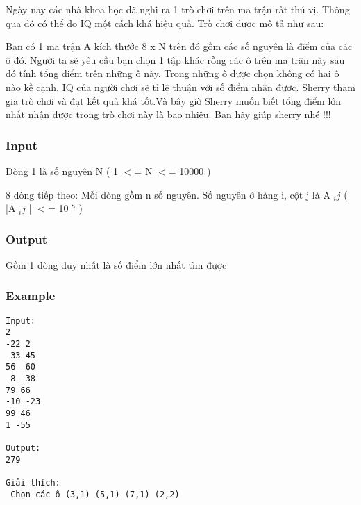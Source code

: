 



   Ngày nay các nhà khoa học đã nghĩ ra 1 trò chơi trên ma trận rất thú vị. Thông qua đó có thể đo IQ một cách khá hiệu quả. Trò chơi được mô tả như sau:  

   Bạn có 1 ma trận A kích thước 8 x N trên đó gồm các số nguyên là điểm của các ô đó. Người ta sẽ yêu cầu bạn chọn 1 tập khác rỗng các ô trên ma trận này sau đó tính tổng điểm trên những ô này. Trong những ô được chọn không có hai ô nào kề cạnh. IQ của người chơi sẽ tỉ lệ thuận với số điểm nhận được. Sherry tham gia trò chơi và đạt kết quả khá tốt.Và bây giờ Sherry muốn biết tổng điểm lớn nhất nhận được trong trò chơi này là bao nhiêu. Bạn hãy giúp sherry nhé !!!  

\subsubsection{   Input  }

   Dòng 1 là số nguyên N ( 1 $<$= N $<$= 10000 )  

   8 dòng tiếp theo: Mỗi dòng gồm n số nguyên. Số nguyên ở hàng i, cột j là A   $_    ij   $   ( |A   $_    ij   $   | $<$= 10   $^    8   $   )  

\subsubsection{   Output  }

   Gồm 1 dòng duy nhất là số điểm lớn nhất tìm được  

\subsubsection{   Example  }
\begin{verbatim}
Input:
2
-22 2
-33 45
56 -60
-8 -38
79 66
-10 -23
99 46
1 -55

Output:
279

Giải thích:
 Chọn các ô (3,1) (5,1) (7,1) (2,2)

\end{verbatim}